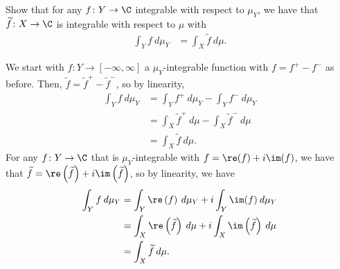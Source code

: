 \documentclass[10pt]{mypackage}
\begin{document}
\begin{problem}
  Show that for any $f\colon Y\to \C$ integrable with respect to $\mu_Y$, we have that $ \widetilde{f}\colon X\to \C $ is integrable with respect to $\mu$ with
  \begin{align*}
    \int_{Y}^{} f\:d\mu_Y &= \int_{X}^{} \widetilde{f}\:d\mu.
  \end{align*}
\end{problem}
\begin{solution}
  We start with $f\colon Y\to [-\infty,\infty]$ a $\mu_Y$-integrable function with $f = f^{+}-f^{-}$ as before. Then, $ \widetilde{f} = \widetilde{f}^{+} - \widetilde{f}^{-} $, so by linearity,
  \begin{align*}
    \int_{Y}^{} f\:d\mu_Y &= \int_{Y}^{} f^{+}\:d\mu_Y - \int_{Y}^{} f^{-}\:d\mu_Y\\
                          &= \int_{X}^{} \widetilde{f}^{+}\:d\mu - \int_{X}^{} \widetilde{f}^{-}\:d\mu\\
                          &= \int_{X}^{} \widetilde{f}\:d\mu.
  \end{align*}
  For any $f\colon Y\to \C$ that is $\mu_Y$-integrable with $f = \re(f) + i \im(f)$, we have that $ \widetilde{f} = \re\left( \widetilde{f} \right) + i\im\left( \widetilde{f} \right) $, so by linearity, we have
  \begin{align*}
    \int_{Y}^{} f\:d\mu_Y &= \int_{Y}^{} \re\left( f \right)\:d\mu_Y + i \int_{Y}^{} \im(f)\:d\mu_Y\\
                          &= \int_{X}^{} \re\left( \widetilde{f} \right)\:d\mu + i\int_{X}^{} \im\left( \widetilde{f} \right)\:d\mu\\
                          &= \int_{X}^{} \widetilde{f}\:d\mu.
  \end{align*}
\end{solution}
\end{document}
